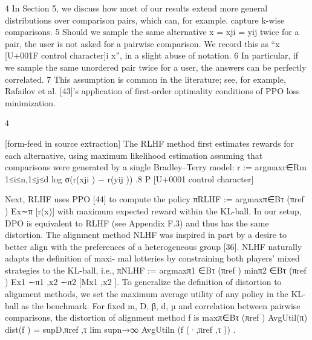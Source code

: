 \documentclass[10pt]{article}
\begin{document}
\begin{ReviewVerbatim}
   4
     In Section 5, we discuss how most of our results extend more general distributions over comparison pairs,
which can, for example. capture k-wise comparisons.
   5
     Should we sample the same alternative x = xji = yij twice for a pair, the user is not asked for a pairwise
comparison. We record this as “x [U+001F control character]i x”, in a slight abuse of notation.
   6
     In particular, if we sample the same unordered pair twice for a user, the answers can be perfectly correlated.
   7
     This assumption is common in the literature; see, for example, Rafailov et al. [43]’s application of first-order
optimality conditions of PPO loss minimization.


                                                           4

[form-feed in source extraction]
The RLHF method first estimates rewards for each alternative, using maximum likelihood estimation
assuming that comparisons were generated by a single Bradley–Terry model:
                  r := argmaxr∈Rm 1≤i≤n,1≤j≤d log σ(r(xji ) − r(yij )) .8
                                     P                                     [U+0001 control character]

Next, RLHF uses PPO [44] to compute the policy πRLHF := argmaxπ∈Bτ (πref ) Ex∼π [r(x)] with
maximum expected reward within the KL-ball. In our setup, DPO is equivalent to RLHF (see
Appendix F.3) and thus has the same distortion.
The alignment method NLHF was inspired in part by a desire to better align with the
preferences of a heterogeneous group [36]. NLHF naturally adapts the definition of maxi-
mal lotteries by constraining both players’ mixed strategies to the KL-ball, i.e., πNLHF :=
argmaxπ1 ∈Bτ (πref ) minπ2 ∈Bτ (πref ) Ex1 ∼π1 ,x2 ∼π2 [Mx1 ,x2 ].
To generalize the definition of distortion to alignment methods, we set the maximum average utility of
any policy in the KL-ball as the benchmark. For fixed m, D, β, d, µ and correlation between pairwise
comparisons, the distortion of alignment method f is
                                                             maxπ∈Bτ (πref ) AvgUtil(π)
                      dist(f ) = supD,πref ,τ lim supn→∞       AvgUtiln (f (·,πref ,τ )) .
\end{ReviewVerbatim}
\end{document}
